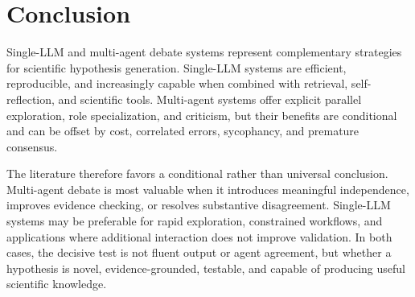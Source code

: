 \documentclass[11pt]{article}
\begin{document}
\section{Conclusion}
\label{sec:conclusion}

Single-LLM and multi-agent debate systems represent complementary strategies for scientific
hypothesis generation. Single-LLM systems are efficient, reproducible, and increasingly capable
when combined with retrieval, self-reflection, and scientific tools. Multi-agent systems offer
explicit parallel exploration, role specialization, and criticism, but their benefits are conditional and
can be offset by cost, correlated errors, sycophancy, and premature consensus.

The literature therefore favors a conditional rather than universal conclusion. Multi-agent debate is
most valuable when it introduces meaningful independence, improves evidence checking, or
resolves substantive disagreement. Single-LLM systems may be preferable for rapid exploration,
constrained workflows, and applications where additional interaction does not improve validation.
In both cases, the decisive test is not fluent output or agent agreement, but whether a hypothesis is
novel, evidence-grounded, testable, and capable of producing useful scientific knowledge.

\nocite{*}


\end{document}
